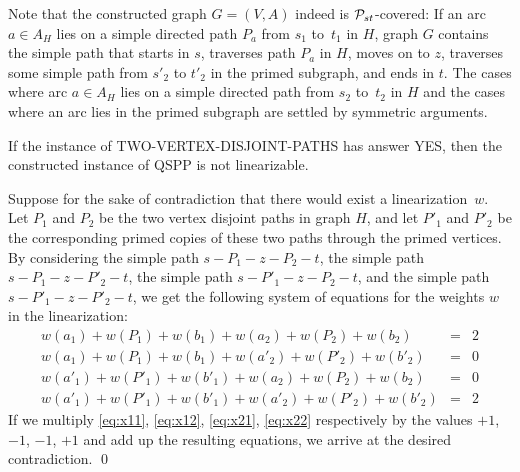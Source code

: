 Note that the constructed graph $G=(V,A)$ indeed is ${\cal P}_{st}$-covered:
If an arc $a\in A_H$ lies on a simple directed path $P_a$ from $s_1$ to~$t_1$ in $H$,
graph $G$ contains the simple path that starts in $s$, traverses path $P_a$ in $H$, moves on to $z$,
traverses some simple path from $s'_2$ to $t'_2$ in the primed subgraph, and ends in $t$.
The cases where arc $a\in A_H$ lies on a simple directed path from $s_2$ to~$t_2$ in $H$ 
and the cases where an arc lies in the primed subgraph are settled by symmetric arguments.
\begin{lemma}
\label{le:hard.1}
If the instance of TWO-VERTEX-DISJOINT-PATHS has answer YES,
then the constructed instance of QSPP is not linearizable.
\end{lemma}
\proof
Suppose for the sake of contradiction that there would exist a linearization~$w$.
Let $P_1$ and $P_2$ be the two vertex disjoint paths in graph $H$, and let $P'_1$ and $P'_2$
be the corresponding primed copies of these two paths through the primed vertices.
By considering 
the simple path $s-P_1-z-P_2-t$,  
the simple path $s-P_1-z-P'_2-t$,  
the simple path $s-P'_1-z-P_2-t$, and 
the simple path $s-P'_1-z-P'_2-t$, 
we get the following system of equations for the weights $w$ in the linearization:
\begin{eqnarray}
w(a_1) +w(P_1 )+w(b_1) +w(a_2) +w(P_2 )+w(b_2)  &=& 2 \label{eq:x11} \\[0.5ex]
w(a_1) +w(P_1 )+w(b_1) +w(a'_2)+w(P'_2)+w(b'_2) &=& 0 \label{eq:x12} \\[0.5ex]
w(a'_1)+w(P'_1)+w(b'_1)+w(a_2) +w(P_2 )+w(b_2)  &=& 0 \label{eq:x21} \\[0.5ex]
w(a'_1)+w(P'_1)+w(b'_1)+w(a'_2)+w(P'_2)+w(b'_2) &=& 2 \label{eq:x22} 
\end{eqnarray}
If we multiply \eqref{eq:x11}, \eqref{eq:x12}, \eqref{eq:x21}, \eqref{eq:x22}
respectively by the values $+1$, $-1$, $-1$, $+1$ and add up the resulting equations,
we arrive at the desired contradiction.
\qed

